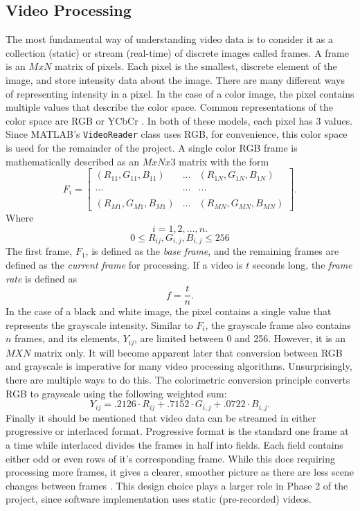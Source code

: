 \documentclass[12pt]{article} %
\begin{document}
\subsection{Video Processing}
\label{sec:vp}
The most fundamental way of understanding video data is to consider it as a collection (static) or stream (real-time) of discrete images called frames. A frame is an $MxN$ matrix of pixels. Each pixel is the smallest, discrete element of the image, and store intensity data about the image. There are many different ways of representing intensity in a pixel. In the case of a color image, the pixel contains multiple values that describe the color space. Common representations of the color space are RGB or YCbCr \cite{1}. In both of these models, each pixel has 3 values.  Since MATLAB's \texttt{VideoReader} class uses RGB, for convenience, this color space is used for the remainder of the project. A single color RGB frame is mathematically described as an $MxNx3$ matrix with the form
\begin{equation}
F_i = 
\begin{bmatrix}
(R_{11}, G_{11}, B_{11}) & ... & (R_{1N}, G_{1N}, B_{1N}) \\
 & &\\
... & ... & ... \\
 & &\\
(R_{M1}, G_{M1}, B_{M1}) & ... & (R_{MN}, G_{MN}, B_{MN}) 
\end{bmatrix}
.
\end{equation}
Where
\[
i = 1, 2, ... , n.
\]
\[
0 \leq R_{ij}, G_{i,j}, B_{i,j} \leq 256
\]
The first frame, $F_1$, is defined as the \textit{base frame}, and the remaining frames are defined as the \textit{current frame} for processing. If a video is $t$ seconds long, the \textit{frame rate }is defined as
\begin{equation}
f = \frac{t}{n}.
\label{eq:framerate}
\end{equation}
In the case of a black and white image, the pixel contains a single value that represents the grayscale intensity. Similar to $F_i$, the grayscale frame also contains $n$ frames, and its elements, $Y_{ij}$, are limited between 0 and 256. However, it is an $MXN$ matrix only. It will become apparent later that conversion between RGB and grayscale is imperative for many video processing algorithms. Unsurprisingly, there are multiple ways to do this. The colorimetric conversion principle converts RGB to grayscale using the following weighted sum:
\begin{equation}
Y_{ij} = .2126 \cdot R_{ij} + .7152 \cdot G_{i,j} + .0722 \cdot B_{i,j}.
\end{equation}
Finally it should be mentioned that video data can be streamed in either progressive or interlaced format. Progressive format is the standard one frame at a time while interlaced divides the frames in half into fields. Each field contains either odd or even rows of it's corresponding frame. While this does requiring processing more frames, it gives a clearer, smoother picture as there are less scene changes between frames \cite{1}. This design choice plays a larger role in Phase 2 of the project, since software implementation uses static (pre-recorded) videos.
\end{document}
